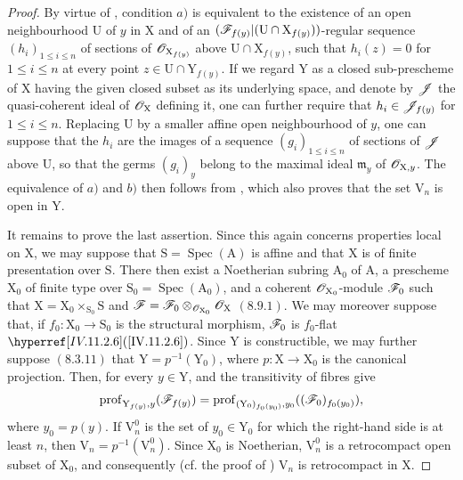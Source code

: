 \begin{proof}
By virtue of , condition $a)$ is equivalent to the existence of an open neighbourhood $\mathrm{U}$ of $y$ in $\mathrm{X}$ and of an $(\mathscr{F}_{f(y)}|(\mathrm{U}\cap\mathrm{X}_{f(y)}))$-regular sequence $(h_i)_{1\leqslant i\leqslant n}$ of sections of $\mathscr{O}_{\mathrm{X}_{f(y)}}$ above $\mathrm{U}\cap\mathrm{X}_{f(y)}$, such that $h_i(z)=0$ for $1\leqslant i\leqslant n$ at every point $z\in\mathrm{U}\cap\mathrm{Y}_{f(y)}$. If we regard $\mathrm{Y}$ as a closed sub-prescheme of $\mathrm{X}$ having the given closed subset as its underlying space, and denote by $\mathscr{J}$ the quasi-coherent ideal of $\mathscr{O}_\mathrm{X}$ defining it, one can further require that $h_i\in\mathscr{J}_{f(y)}$ for $1\leqslant i\leqslant n$. Replacing $\mathrm{U}$ by a smaller affine open neighbourhood of $y$, one can suppose that the $h_i$ are the images of a sequence $(g_i)_{1\leqslant i\leqslant n}$ of sections of $\mathscr{J}$ above $\mathrm{U}$, so that the germs $(g_i)_y$ belong to the maximal ideal $\mathfrak{m}_y$ of $\mathscr{O}_{\mathrm{X},y}$. The equivalence of $a)$ and $b)$ then follows from , which also proves that the set $\mathrm{V}_n$ is open in $\mathrm{Y}$.

It remains to prove the last assertion. Since this again concerns properties local on $\mathrm{X}$, we may suppose that $\mathrm{S}=\operatorname{Spec}(\mathrm{A})$ is affine and that $\mathrm{X}$ is of finite presentation over $\mathrm{S}$. There then exist a Noetherian subring $\mathrm{A}_0$ of $\mathrm{A}$, a prescheme $\mathrm{X}_0$ of finite type over $\mathrm{S}_0=\operatorname{Spec}(\mathrm{A}_0)$, and a coherent $\mathscr{O}_{\mathrm{X}_0}$-module $\mathscr{F}_0$ such that $\mathrm{X}=\mathrm{X}_0\times_{\mathrm{S}_0}\mathrm{S}$ and $\mathscr{F}=\mathscr{F}_0\otimes_{\mathscr{O}_{\mathrm{X}_0}}\mathscr{O}_\mathrm{X}$ $(8.9.1)$. We may moreover suppose that, if $f_0:\mathrm{X}_0\to\mathrm{S}_0$ is the structural morphism, $\mathscr{F}_0$ is $f_0$-flat $\sref{IV.11.2.6}$. Since $\mathrm{Y}$ is constructible, we may further suppose $(8.3.11)$ that $\mathrm{Y}=p^{-1}(\mathrm{Y}_0)$, where $p:\mathrm{X}\to\mathrm{X}_0$ is the canonical projection. Then, for every $y\in\mathrm{Y}$,  and the transitivity of fibres give
\[
  \operatorname{prof}_{\mathrm{Y}_{f(y)},y}(\mathscr{F}_{f(y)})
  =\operatorname{prof}_{(\mathrm{Y}_0)_{f_0(y_0)},y_0}((\mathscr{F}_0)_{f_0(y_0)}),
\]
where $y_0=p(y)$. If $\mathrm{V}_n^0$ is the set of $y_0\in\mathrm{Y}_0$ for which the right-hand side is at least $n$, then $\mathrm{V}_n=p^{-1}(\mathrm{V}_n^0)$. Since $\mathrm{X}_0$ is Noetherian, $\mathrm{V}_n^0$ is a retrocompact open subset of $\mathrm{X}_0$, and consequently (cf. the proof of ) $\mathrm{V}_n$ is retrocompact in $\mathrm{X}$.
\end{proof}

